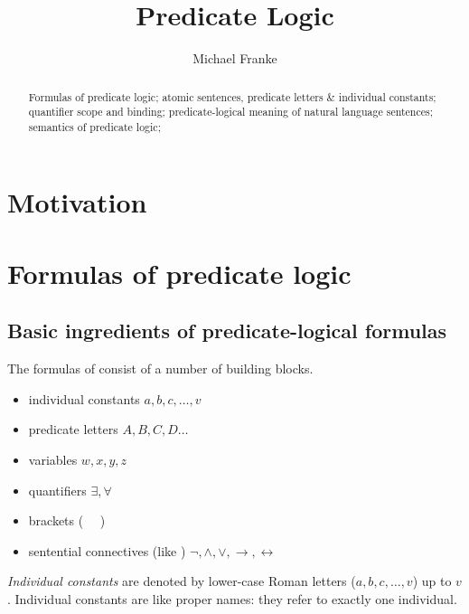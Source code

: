 \documentclass[nobib,nofonts]{tufte-handout}
\title{Predicate Logic}
\author[M.~Franke]{Michael Franke}
\date{} %
\newcommand{\proplog}{\acro{PropLog}}
\newcommand{\predlog}{\acro{PredLog}}
\begin{document}
\maketitle

\begin{abstract}
\noindent
Formulas of predicate logic; atomic sentences, predicate letters \& individual constants;
quantifier scope and binding;
predicate-logical meaning of natural language sentences;
semantics of predicate logic;
\end{abstract}

\section{Motivation}



\section{Formulas of predicate logic}

\subsection{Basic ingredients of predicate-logical formulas}

The formulas of \predlog consist of a number of building blocks.
\begin{itemize}
  \item individual constants \hfill $a,b,c, \dots, v$
  \item predicate letters \hfill $A, B, C, D \dots$
  \item variables \hfill $w, x,y,z$
  \item quantifiers \hfill $\exists, \forall$
  \item brackets \hfill ( \ \ )
  \item sentential connectives (like \proplog) \hfill $\neg, \wedge, \vee,
  \rightarrow, \leftrightarrow$
\end{itemize}

\emph{Individual constants} are denoted by lower-case Roman letters ($a, b, c, \dots, v $) up to $v$.
Individual constants are like proper names: they refer to exactly one individual.
\end{document}
